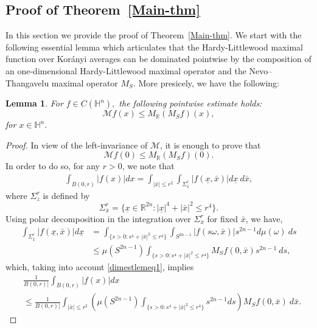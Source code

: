 \documentclass[11pt]{amsart}
\newcommand{\Ha}{\mathbb{H}^n}
\newtheorem{lemma}[theorem]{Lemma}
\theoremstyle{definition}
\numberwithin{equation}{section}
\begin{document}
\subsection{Proof of Theorem~\ref{Main-thm}}
In this section we provide the proof of Theorem~\ref{Main-thm}. We start with the following essential lemma which articulates that the Hardy-Littlewood maximal function over Kor\'anyi averages can be dominated pointwise by the composition of an one-dimensional Hardy-Littlewood maximal operator and the Nevo--Thangavelu maximal operator $M_{S}$. More presicely, we have the following: 
\begin{lemma}
\label{hlmax-ptest}
    For $f\in C(\Ha),$ the following pointwise estimate holds: 
    $$\mathcal{M}f(x)\leq M_{\mathbb{R}}(M_Sf)(x),$$
    for $x\in \Ha.$ 
\end{lemma}
\begin{proof}
     In view of the left-invariance of $\mathcal{M}$, it is enough to prove that 
     \begin{equation}
     \label{dimestclaim}
         \mathcal{M}f(0)\leq M_{\mathbb{R}}(M_Sf)(0).
     \end{equation}
    In order to do so, for any $r>0$, we note that 
     \begin{align}
     \label{dimestlemeq1}
         \int_{B(0,r)}|f(x)|dx= \int_{|\bar{x}|\leq r^2}\int_{\Sigma^r_{\bar{x}}}|f(\underline{x}, \bar{x})| d\underline{x}~d\bar{x},
     \end{align}
     where $\Sigma^r_z$ is defined by 
     $$\Sigma^r_{\bar{x}}=\{\underline{x}\in \mathbb{R}^{2n}:  |\underline{x}|^4+|\bar{x}|^2\leq r^4\}.$$
     Using polar decomposition in the integration over $\Sigma^r_{\bar{x}}$ for fixed $\bar{x}$, we have, 
     \begin{align*}
         \int_{\Sigma^r_{\bar{x}}}|f(\underline{x}, \bar{x})| d\underline{x}&=\int_{\{s>0: s^4+|\bar{x}|^2\leq r^4\}}\int_{S^{2n-1}} |f(s\omega, \bar{x})|s^{2n-1}d\mu(\omega)~ds\\
         &\leq \mu(S^{2n-1})\int_{\{s>0: s^4+|\bar{x}|^2\leq r^4\}} M_Sf(0, \bar{x}) s^{2n-1}~ds,
     \end{align*}
     which, taking into account \eqref{dimestlemeq1}, implies 
     \begin{align*}
         &\frac{1}{B(0,r)|} \int_{B(0,r)}|f(x)|dx\\ &\leq \frac{1}{B(0,r)|}\int_{|\bar{x}|\leq r^2}\left(\mu(S^{2n-1})\int_{\{s>0: s^4+|\bar{x}|^2\leq r^4\}}s^{2n-1}ds\right) M_Sf(0, \bar{x})~d\bar{x}.
     \end{align*}

\end{proof}
\end{document}
